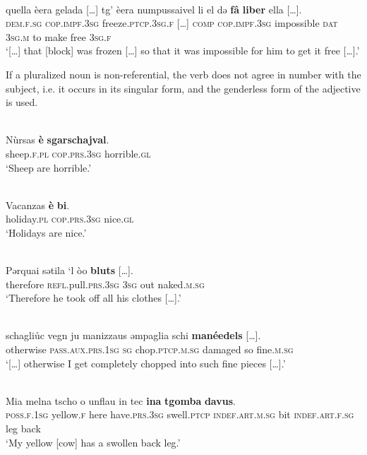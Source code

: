 {\ea\label{}
\\
\gll   […] quella èera gelada […] tg' èera numpussaivel li el də \textbf{fâ} \textbf{liber} ella […].\\
      […] \textsc{dem.f.sg} \textsc{cop.impf.3sg} freeze.\textsc{ptcp.3sg.f} […] \textsc{comp} \textsc{cop.impf.3sg} impossible \textsc{dat} \textsc{3sg.m} to make free \textsc{3sg.f}\\
\glt `[…] that [block] was frozen […] so that it was impossible for him to get it free […].'
\z

If a pluralized noun is non-referential, the verb does not agree in number with the subject, i.e. it occurs in its singular form, and the genderless form of the adjective is used.

\ea\label{}
\\
\gll Nùrsas \textbf{è} \textbf{sgarschajval}.   \\
 sheep.\textsc{f.pl} \textsc{cop.prs.3sg} horrible.\textsc{gl} \\
\glt `Sheep are horrible.'
\z

\ea\label{}
\\
\gll Vacanzas \textbf{è} \textbf{bi}.   \\
holiday.\textsc{pl} \textsc{cop.prs.3sg} nice.\textsc{gl}   \\
\glt `Holidays are nice.'
\z


\ea\label{}
\\
\gll    Pǝrquai sǝtila ‘l òo \textbf{bluts} […].\\
     therefore \textsc{refl}.pull.\textsc{prs.3sg} \textsc{3sg} out naked.\textsc{m.sg}\\
\glt `Therefore he took off all his clothes […].'
\z

\ea\label{}
\\
\gll    […] schagliůc vegn ju manizzaus əmpaglia schi \textbf{manéedels} […].\\
     [..] otherwise \textsc{pass.aux.prs.1sg} \textsc{sg} chop.\textsc{ptcp.m.sg} damaged so fine.\textsc{m.sg}\\
\glt `[…] otherwise I get completely chopped into such fine pieces […].'
\z
 
 \ea\label{ex:}
\\
\gll  Mia melna tscho o unflau in tec \textbf{ina} \textbf{tgomba} \textbf{davus}.  \\
     \textsc{poss.f.1sg} yellow.\textsc{f} here have.\textsc{prs.3sg} swell.\textsc{ptcp}  \textsc{indef.art.m.sg} bit \textsc{indef.art.f.sg} leg back\\
\glt `My yellow [cow] has a swollen back leg.'
\z


}
